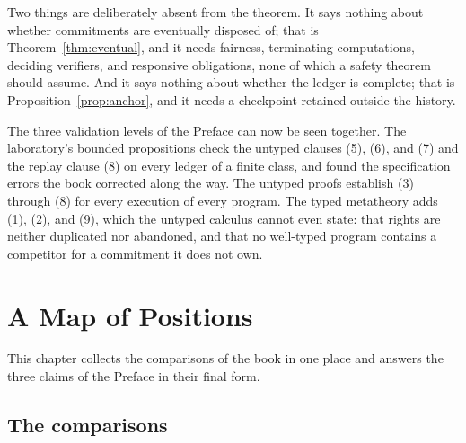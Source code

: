 \documentclass[11pt,openany]{book}
\theoremstyle{remark}
\begin{document}
Two things are deliberately absent from the theorem. It says nothing about
whether commitments are eventually disposed of; that is
Theorem~\ref{thm:eventual}, and it needs fairness, terminating
computations, deciding verifiers, and responsive obligations, none of
which a safety theorem should assume. And it says nothing about whether
the ledger is complete; that is Proposition~\ref{prop:anchor}, and it
needs a checkpoint retained outside the history.

The three validation levels of the Preface can now be seen together.
The laboratory's bounded propositions check the untyped clauses (5), (6),
and (7) and the replay clause (8) on every ledger of a finite class, and
found the specification errors the book corrected along the way. The
untyped proofs establish (3) through (8) for every execution of every
program. The typed metatheory adds (1), (2), and (9), which the untyped
calculus cannot even state: that rights are neither duplicated nor
abandoned, and that no well-typed program contains a competitor for a
commitment it does not own.

\chapter{A Map of Positions}
\label{ch:map}

This chapter collects the comparisons of the book in one place and
answers the three claims of the Preface in their final form.

\section{The comparisons}
\end{document}
